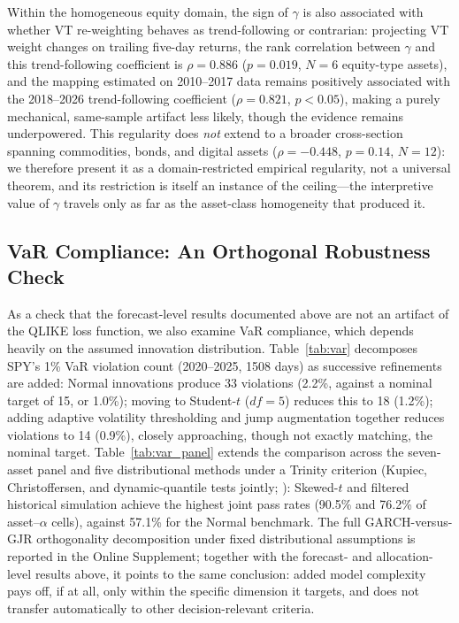 Within the homogeneous equity domain, the sign of $\gamma$ is also associated with whether VT re-weighting behaves as trend-following or contrarian: projecting VT weight changes on trailing five-day returns, the rank correlation between $\gamma$ and this trend-following coefficient is $\rho=0.886$ ($p=0.019$, $N=6$ equity-type assets), and the mapping estimated on 2010--2017 data remains positively associated with the 2018--2026 trend-following coefficient ($\rho=0.821$, $p<0.05$), making a purely mechanical, same-sample artifact less likely, though the evidence remains underpowered. This regularity does \emph{not} extend to a broader cross-section spanning commodities, bonds, and digital assets ($\rho=-0.448$, $p=0.14$, $N=12$): we therefore present it as a domain-restricted empirical regularity, not a universal theorem, and its restriction is itself an instance of the ceiling---the interpretive value of $\gamma$ travels only as far as the asset-class homogeneity that produced it.

\subsection{VaR Compliance: An Orthogonal Robustness Check}
\label{sec:var_compliance}

As a check that the forecast-level results documented above are not an artifact of the QLIKE loss function, we also examine VaR compliance, which depends heavily on the assumed innovation distribution.%
Table~\ref{tab:var} decomposes SPY's 1\% VaR violation count (2020--2025, 1508 days) as successive refinements are added: Normal innovations produce 33 violations (2.2\%, against a nominal target of 15, or 1.0\%); moving to Student-$t$ ($df=5$) reduces this to 18 (1.2\%); adding adaptive volatility thresholding and jump augmentation together reduces violations to 14 (0.9\%), closely approaching, though not exactly matching, the nominal target. Table~\ref{tab:var_panel} extends the comparison across the seven-asset panel and five distributional methods under a Trinity criterion (Kupiec, Christoffersen, and dynamic-quantile tests jointly; \citealt{kupiec1995,christoffersen1998}): Skewed-$t$ and filtered historical simulation achieve the highest joint pass rates (90.5\% and 76.2\% of asset--$\alpha$ cells), against 57.1\% for the Normal benchmark. The full GARCH-versus-GJR orthogonality decomposition under fixed distributional assumptions is reported in the Online Supplement; together with the forecast- and allocation-level results above, it points to the same conclusion: added model complexity pays off, if at all, only within the specific dimension it targets, and does not transfer automatically to other decision-relevant criteria.

